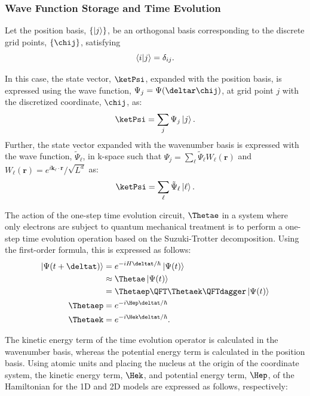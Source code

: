 \documentclass[manuscript_main.tex]{subfiles}
\begin{document}
\subsubsection{Wave Function Storage and Time Evolution}
Let the position basis, $\{\ket{j}\}$, be an orthogonal basis corresponding to the
discrete grid points, $\{\chij\}$, satisfying
\begin{equation}
\braket{i|j}=\delta_{ij}.
\end{equation}

In this case, the state vector, $\ketPsi$, expanded with the position basis, is
expressed using the wave function, $\Psi_j=\Psi(\deltar\chij)$, at grid point
$j$ with the discretized coordinate, $\chij$, as:
\begin{equation}
\ketPsi = \sum_{j}\Psi_j\ket{j}.
\end{equation}
Further, the state vector expanded with the wavenumber basis is expressed with
the wave function, $\tilde{\Psi}_{\ell}$, in k-space such that
$\Psi_j=\sum_{\ell} \tilde{\Psi}_{\ell}W_{\ell}(\bm{r})$ and
$W_{\ell}(\bm{r})=e^{i\bm{k}_{\ell}\cdot\bm{r}}/\sqrt{L^d}$ as:
\begin{equation}
\ketPsi = \sum_{\ell}\tilde{\Psi}_{\ell}\ket{\ell}.
\end{equation}

The action of the one-step time evolution circuit, $\Thetae$ in a system where
only electrons are subject to quantum mechanical treatment is to perform a
one-step time evolution operation based on the Suzuki-Trotter decomposition.
Using the first-order formula, this is expressed as follows:
\begin{align}
\ket{\Psi(t+\deltat)}
 &= e^{-iH\deltat/\hbar}\ket{\Psi(t)} \notag \\
 &\approx \Thetae \ket{\Psi(t)} \label{eq:circuit-eval-theta-e}\\
 &= \Thetaep\QFT\Thetaek\QFTdagger\ket{\Psi(t)}\\
    \Thetaep&=e^{-i\Hep\deltat/\hbar}\\
    \Thetaek&=e^{-i\Hek\deltat/\hbar}.
\end{align}

The kinetic energy term of the time evolution operator is calculated in the
wavenumber basis, whereas the potential energy term is calculated in the
position basis. Using atomic units and placing the nucleus at the origin of the
coordinate system, the kinetic energy term, $\Hek$, and potential energy term,
$\Hep$, of the Hamiltonian for the 1D and 2D models are expressed as follows,
respectively:
\end{document}
